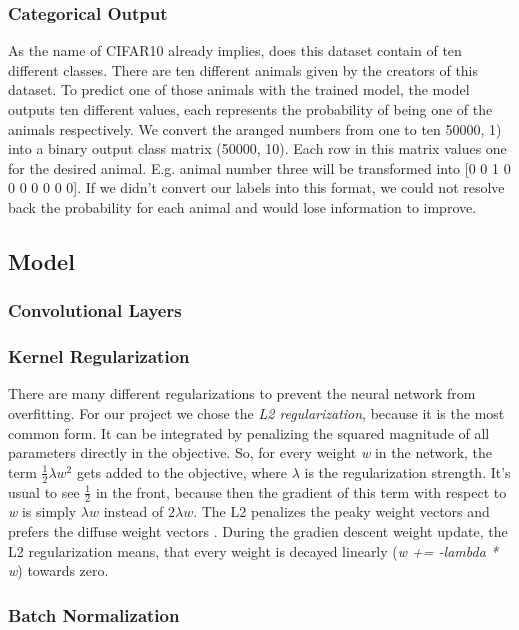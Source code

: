 \documentclass[journal]{IEEEtran}
\begin{document}
\subsubsection{Categorical Output}
As the name of CIFAR10 already implies, does this dataset contain of ten different classes. There are ten different animals given by the creators of this dataset. To predict one of those animals with the trained model, the model outputs ten different values, each represents the probability of being one of the animals respectively. 
We convert the aranged numbers from one to ten 50000, 1) into a binary output class matrix (50000, 10). Each row in this matrix values one for the desired animal. E.g. animal number three will be transformed into [0 0 1 0 0 0 0 0 0 0].
If we didn't convert our labels into this format, we could not resolve back the probability for each animal and would lose information to improve. 

\subsection{Model}
\subsubsection{Convolutional Layers}
\subsubsection{Kernel Regularization}
There are many different regularizations to prevent the neural network from overfitting. For our project we chose the \textit{L2 regularization}, because it is the most common form.
It can be integrated by penalizing the squared magnitude of all parameters directly in the objective. So, for every weight \textit{w} in the network, the term \(\frac{1}{2} \lambda w^2\) gets added to the objective, where \(\lambda \) is the regularization strength. It's usual to see \(\frac{1}{2}\) in the front, because then the gradient of this term with respect to \textit{w} is simply \(\lambda w\) instead of \(2 \lambda w\). The L2 penalizes the peaky weight vectors and prefers the diffuse weight vectors \cite{RN4}. During the gradien descent weight update, the L2 regularization means, that every weight is decayed linearly (\textit{w += -lambda * w}) towards zero.
\subsubsection{Batch Normalization}
\end{document}
